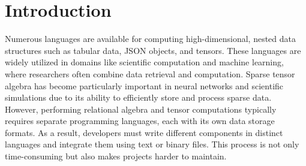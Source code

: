 \documentclass[acmsmall,nonacm]{acmart}\settopmatter{printfolios=true,printccs=false,printacmref=false}
\begin{document}

\maketitle

\section{Introduction}\label{introduction}

Numerous languages are available for computing high-dimensional, nested data structures such as tabular data, JSON objects, and tensors. These languages are widely utilized in domains like scientific computation and machine learning, where researchers often combine data retrieval and computation. Sparse tensor algebra has become particularly important in neural networks and scientific simulations due to its ability to efficiently store and process sparse data. However, performing relational algebra and tensor computations typically requires separate programming languages, each with its own data storage formats. As a result, developers must write different components in distinct languages and integrate them using text or binary files. This process is not only time-consuming but also makes projects harder to maintain.\par
\end{document}
